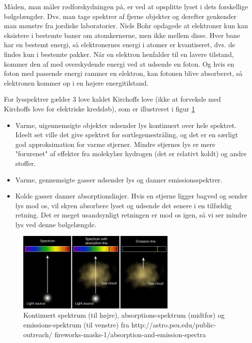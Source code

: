 Måden, man måler rødforskydningen på, er ved at opsplitte lyset i dets forskellige bølgelængder. Dvs. man tage spektrer af fjerne objekter og derefter genkender man mønstre fra jordiske laboratorier. Niels Bohr opdagede at elektroner kun kan eksistere i bestemte baner om atomkernerne, men ikke mellem disse. Hver bane har en bestemt energi, så elektronernes energi i atomer er kvantiseret, dvs. de findes kun i bestemte pakker. Når en elektron henfalder til en lavere tilstand, kommer den af med overskydende energi ved at udsende en foton. Og hvis en foton med passende energi rammer en elektron, kan fotonen blive absorberet, så elektronen kommer op i en højere energitilstand. 

For lysspektrer gælder 3 love kaldet Kirchoffs love (ikke at forveksle med Kirchoffs love for elektriske kredsløb), som er illustreret i figur \ref{kirchoff}
\begin{itemize}
	\item Varme, uigennemsigte objekter udsender lys kontinuert over hele spektret. Ideelt set ville det give spektret for sortlegemestråling, og det er en særligt god approksimation for varme stjerner. Mindre stjernes lys er mere "forurenet" af effekter fra molekylær hydrogen (det er relativt koldt) og andre stoffer.
	\item Varme, gennemsigte gasser udsender lys og danner emissionsspektrer.
	\item Kolde gasser danner absorptionslinjer. Hvis en stjerne ligger bagved og sender lys mod os, vil skyen absorbere lyset og udsende det senere i en tilfældig retning. Det er meget usandsynligt retningen er mod os igen, så vi ser mindre lys ved denne bølgelængde.
\end{itemize}

\begin{figure}[h]
	\centering
	\includegraphics[width=0.7\textwidth]{Astrofysik/Astrofig/kirchoffslaws.jpg}
	\caption{Kontinuert spektrum (til højre), absorptions-spektrum (midtfor) og
		emissions-spektrum (til venstre) fra http://astro.psu.edu/public-outreach/
		fireworks-masks-1/absorption-and-emission-spectra}
	\label{kirchoff}
\end{figure}

